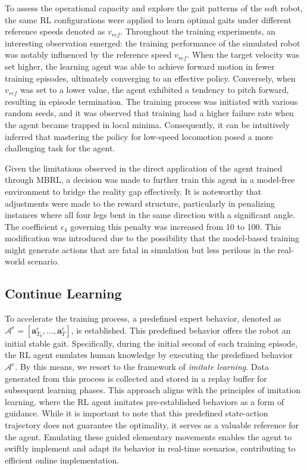To assess the operational capacity and explore the gait patterns of the soft robot, the same RL configurations were applied to learn optimal gaits under different reference speeds denoted as $v_{ref}$. Throughout the training experiments, an interesting observation emerged: the training performance of the simulated robot was notably influenced by the reference speed $v_{ref}$. When the target velocity was set higher, the learning agent was able to achieve forward motion in fewer training episodes, ultimately converging to an effective policy. Conversely, when $v_{ref}$ was set to a lower value, the agent exhibited a tendency to pitch forward, resulting in episode termination. The training process was initiated with various random seeds, and it was observed that training had a higher failure rate when the agent became trapped in local minima. Consequently, it can be intuitively inferred that mastering the policy for low-speed locomotion posed a more challenging task for the agent.

Given the limitations observed in the direct application of the agent trained through MBRL, a decision was made to further train this agent in a model-free environment to bridge the reality gap effectively. It is noteworthy that adjustments were made to the reward structure, particularly in penalizing instances where all four legs bent in the same direction with a significant angle. The coefficient $\epsilon_4$ governing this penalty was increased from 10 to 100. This modification was introduced due to the possibility that the model-based training might generate actions that are fatal in simulation but less perilous in the real-world scenario.

\subsection{Continue Learning}
To accelerate the training process, a predefined expert behavior, denoted as $\mathcal{A}^e = [\textbf{a}_{T_0}^e, ..., \textbf{a}_T^e]$, is established\cite{ji2022Synthesizing}. This predefined behavior offers the robot an initial stable gait. Specifically, during the initial second of each training episode, the RL agent emulates human knowledge by executing the predefined behavior $\mathcal{A}^e$. By this means, we resort to the framework of \textit{imitate learning}\cite{kober2010Imitation}. Data generated from this process is collected and stored in a replay buffer for subsequent learning phases. This approach aligns with the principles of imitation learning, where the RL agent imitates pre-established behaviors as a form of guidance. While it is important to note that this predefined state-action trajectory does not guarantee the optimality, it serves as a valuable reference for the agent. Emulating these guided elementary movements enables the agent to swiftly implement and adapt its behavior in real-time scenarios, contributing to efficient online implementation. 

